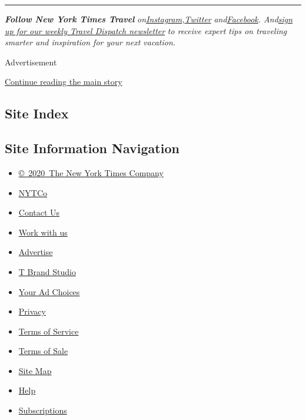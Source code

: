 \begin{center}\rule{0.5\linewidth}{\linethickness}\end{center}

\emph{\textbf{Follow New York Times Travel}}
\emph{on}\href{https://www.instagram.com/nytimestravel/}{\emph{Instagram}}\emph{,}\href{https://twitter.com/nytimestravel}{\emph{Twitter}}
\emph{and}\href{https://www.facebookcorewwwi.onion/nytimestravel/}{\emph{Facebook}}\emph{.
And}\href{https://www.nytimes3xbfgragh.onion/newsletters/traveldispatch}{\emph{sign
up for our weekly Travel Dispatch newsletter}} \emph{to receive expert
tips on traveling smarter and inspiration for your next vacation.}

Advertisement

\protect\hyperlink{after-bottom}{Continue reading the main story}

\hypertarget{site-index}{%
\subsection{Site Index}\label{site-index}}

\hypertarget{site-information-navigation}{%
\subsection{Site Information
Navigation}\label{site-information-navigation}}

\begin{itemize}
\tightlist
\item
  \href{https://help.nytimes3xbfgragh.onion/hc/en-us/articles/115014792127-Copyright-notice}{©~2020~The
  New York Times Company}
\end{itemize}

\begin{itemize}
\tightlist
\item
  \href{https://www.nytco.com/}{NYTCo}
\item
  \href{https://help.nytimes3xbfgragh.onion/hc/en-us/articles/115015385887-Contact-Us}{Contact
  Us}
\item
  \href{https://www.nytco.com/careers/}{Work with us}
\item
  \href{https://nytmediakit.com/}{Advertise}
\item
  \href{http://www.tbrandstudio.com/}{T Brand Studio}
\item
  \href{https://www.nytimes3xbfgragh.onion/privacy/cookie-policy\#how-do-i-manage-trackers}{Your
  Ad Choices}
\item
  \href{https://www.nytimes3xbfgragh.onion/privacy}{Privacy}
\item
  \href{https://help.nytimes3xbfgragh.onion/hc/en-us/articles/115014893428-Terms-of-service}{Terms
  of Service}
\item
  \href{https://help.nytimes3xbfgragh.onion/hc/en-us/articles/115014893968-Terms-of-sale}{Terms
  of Sale}
\item
  \href{https://spiderbites.nytimes3xbfgragh.onion}{Site Map}
\item
  \href{https://help.nytimes3xbfgragh.onion/hc/en-us}{Help}
\item
  \href{https://www.nytimes3xbfgragh.onion/subscription?campaignId=37WXW}{Subscriptions}
\end{itemize}
